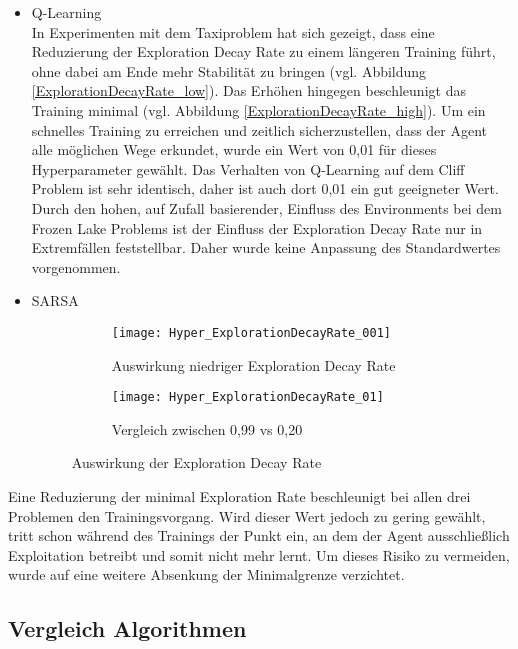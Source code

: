 \begin{itemize}
  \item Q-Learning\\
  In Experimenten mit dem Taxiproblem hat sich gezeigt, dass eine Reduzierung der Exploration Decay Rate zu einem längeren Training führt, ohne dabei am Ende mehr Stabilität zu bringen (vgl. Abbildung \ref{ExplorationDecayRate_low}).
  Das Erhöhen hingegen beschleunigt das Training minimal (vgl. Abbildung \ref{ExplorationDecayRate_high}).
  Um ein schnelles Training zu erreichen und zeitlich sicherzustellen, dass der Agent alle möglichen Wege erkundet, wurde ein Wert von 0,01 für dieses Hyperparameter gewählt.
  Das Verhalten von Q-Learning auf dem Cliff Problem ist sehr identisch, daher ist auch dort 0,01 ein gut geeigneter Wert.
  Durch den hohen, auf Zufall basierender, Einfluss des Environments bei dem Frozen Lake Problems ist der Einfluss der Exploration Decay Rate nur in Extremfällen feststellbar.
  Daher wurde keine Anpassung des Standardwertes vorgenommen.
  \item SARSA\\
  \begin{figure}[H]
    \centering
    \begin{subfigure}{.5\textwidth}
      \centering
      \texttt{[image: Hyper\_ExplorationDecayRate\_001]}
      \caption{Auswirkung niedriger Exploration Decay Rate}
      \label{fig:ExplorationDecayRate_low}
    \end{subfigure}%
    \begin{subfigure}{.5\textwidth}
      \centering
      \texttt{[image: Hyper\_ExplorationDecayRate\_01]}
      \caption{Vergleich zwischen 0,99 vs 0,20}
      \label{fig:ExplorationDecayRate_high}
    \end{subfigure}
    \caption{Auswirkung der Exploration Decay Rate}
    \label{fig:ExplorationDecayRate_Q-Learning}
  \end{figure}
\end{itemize}
Eine Reduzierung der minimal Exploration Rate beschleunigt bei allen drei Problemen den Trainingsvorgang.
Wird dieser Wert jedoch zu gering gewählt, tritt schon während des Trainings der Punkt ein, an dem der Agent ausschließlich Exploitation betreibt und somit nicht mehr lernt.
Um dieses Risiko zu vermeiden, wurde auf eine weitere Absenkung der Minimalgrenze verzichtet.
\subsection{Vergleich Algorithmen}

